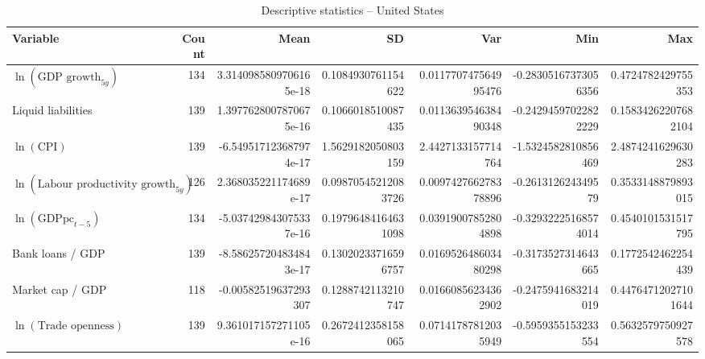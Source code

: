 \begin{table}[!htbp]
\centering
\caption{Descriptive statistics -- United States}
\footnotesize
\begin{tabular}{lrrrrrr}
\toprule
Variable & Count & Mean & SD & Var & Min & Max \\
\midrule
$\ln(\text{GDP growth}_{5y})$ & 134 & 3.3140985809706165e-18 & 0.1084930761154622 & 0.011770747564995476 & -0.28305167373056356 & 0.4724782429755353 \\
Liquid liabilities & 139 & 1.3977628007870675e-16 & 0.1066018510087435 & 0.011363954638490348 & -0.24294597022822229 & 0.15834262207682104 \\
$\ln(\text{CPI})$ & 139 & -6.549517123687974e-17 & 1.5629182050803159 & 2.4427133157714764 & -1.5324582810856469 & 2.4874241629630283 \\
$\ln(\text{Labour productivity growth}_{5y})$ & 126 & 2.368035221174689e-17 & 0.09870545212083726 & 0.009742766278378896 & -0.261312624349579 & 0.3533148879893015 \\
$\ln(\text{GDPpc}_{t-5})$ & 134 & -5.037429843075337e-16 & 0.19796484164631098 & 0.03919007852804898 & -0.32932225168574014 & 0.4540101531517795 \\
Bank loans / GDP & 139 & -8.586257204834843e-17 & 0.13020233716596757 & 0.016952648603480298 & -0.3173527314643665 & 0.1772542462254439 \\
Market cap / GDP & 118 & -0.00582519637293307 & 0.1288742113210747 & 0.01660856234362902 & -0.2475941683214019 & 0.44764712027101644 \\
$\ln(\text{Trade openness})$ & 139 & 9.361017157271105e-16 & 0.2672412358158065 & 0.07141787812035949 & -0.5959355153233554 & 0.5632579750927578 \\
\bottomrule
\end{tabular}
\end{table}

